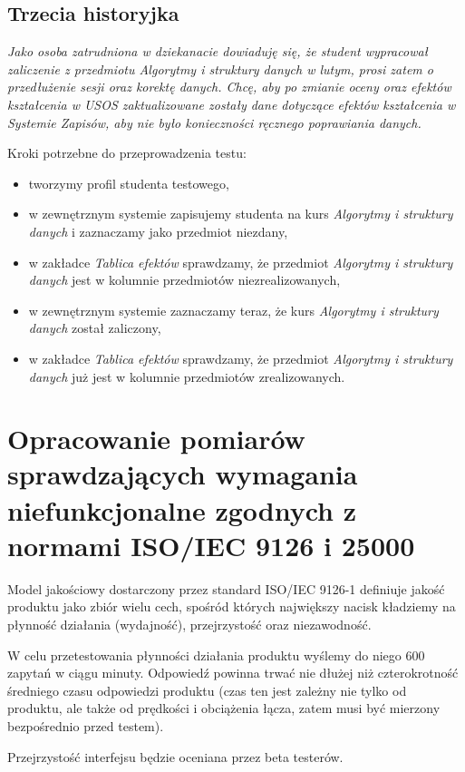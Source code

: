 \documentclass{article}
\begin{document}
\subsection{Trzecia historyjka}
\textit{Jako osoba zatrudniona w dziekanacie dowiaduję się, że student wypracował zaliczenie z przedmiotu \textit{Algorytmy i struktury danych} w lutym, prosi zatem o przedłużenie sesji oraz korektę danych. 
Chcę, aby po zmianie oceny oraz efektów kształcenia w USOS zaktualizowane zostały dane dotyczące efektów kształcenia w Systemie Zapisów, aby nie było konieczności ręcznego poprawiania danych.}

\medskip
\noindent Kroki potrzebne do przeprowadzenia testu:
\begin{itemize}
 \item tworzymy profil studenta testowego,
 \item w zewnętrznym systemie zapisujemy studenta na kurs \textit{Algorytmy i struktury danych} i zaznaczamy jako przedmiot niezdany,
 \item w zakładce \textit{Tablica efektów} sprawdzamy, że przedmiot \textit{Algorytmy i struktury danych} jest w kolumnie przedmiotów niezrealizowanych,
 \item w zewnętrznym systemie zaznaczamy teraz, że kurs \textit{Algorytmy i struktury danych} został zaliczony,
 \item w zakładce \textit{Tablica efektów} sprawdzamy, że przedmiot \textit{Algorytmy i struktury danych} już jest w kolumnie przedmiotów zrealizowanych.
\end{itemize}

\section{Opracowanie pomiarów sprawdzających wymagania niefunkcjonalne zgodnych z normami ISO/IEC 9126 i 25000}
Model jakościowy dostarczony przez standard ISO/IEC 9126-1 definiuje jakość produktu jako zbiór wielu cech, spośród których największy nacisk kładziemy na płynność działania (wydajność), przejrzystość oraz niezawodność.

W celu przetestowania płynności działania produktu wyślemy do niego 600 zapytań w ciągu minuty.
Odpowiedź powinna trwać nie dłużej niż czterokrotność średniego czasu odpowiedzi produktu (czas ten jest zależny nie tylko od produktu, ale także od prędkości i obciążenia łącza, zatem musi być mierzony bezpośrednio przed testem).

Przejrzystość interfejsu będzie oceniana przez beta testerów.
\end{document}
